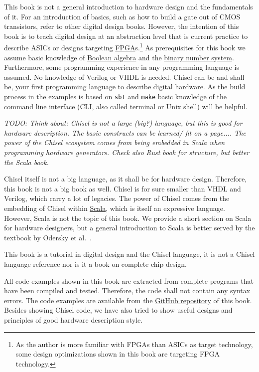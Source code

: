 \documentclass[%
    10pt, %
    headinclude, footexclude,
    openright, %
    notitlepage,
    cleardoubleempty,
    headsepline,
    pointlessnumbers,
    bibtotoc, idxtotoc,
    ]{scrbook}
\newcommand{\code}[1]{{\small{\texttt{#1}}}}
\newcommand{\todo}[1]{{\emph{TODO: #1}}}
\newcommand{\myref}[2]{\href{#1}{#2}}
\begin{document}
This book is not a general introduction to hardware design and the fundamentals of it.
For an introduction of basics, such as how to build a gate out of CMOS transistors,
refer to other digital design books.
However, the intention of this book is to teach digital design at an abstraction level that is
current practice to describe ASICs or designs targeting
\myref{https://en.wikipedia.org/wiki/Field-programmable_gate_array}{FPGA}s.\footnote{As the author is more familiar with FPGAs
than ASICs as target technology, some design optimizations shown in this book are
targeting FPGA technology.}
As prerequisites for this book we assume basic knowledge of
\myref{https://en.wikipedia.org/wiki/Boolean_algebra}{Boolean algebra} and the
\myref{https://en.wikipedia.org/wiki/Binary_number}{binary number system}.
Furthermore, some programming experience in any programming language
is assumed. No knowledge of Verilog or VHDL is needed.
Chisel can be and shall be, your first programming language to describe digital hardware.
As the build process in the examples is based on \code{sbt} and \code{make}
basic knowledge of the command line interface (CLI, also called terminal or
Unix shell) will be helpful.

\todo{Think about: Chisel is not a large (big?) language, but this is good for hardware description. The basic constructs can be learned/ fit on a page.... The power of the Chisel ecosystem comes from being embedded in Scala when programming hardware generators.
Check also Rust book for structure, but better the Scala book.}

Chisel itself is not a big language, as it shall be for hardware design.
Therefore, this book is not a big book as well.
Chisel is for sure smaller than VHDL and Verilog, which carry a lot of legacies.
The power of Chisel comes from the embedding of Chisel within
\myref{https://www.scala-lang.org/}{Scala}, which is itself an expressive language.
However, Scala is not the topic
of this book. We provide a short section on Scala for hardware designers,
but a general introduction to Scala is better served by the textbook by
Odersky et al.~\cite{Scala}.

This book is a tutorial in digital design and the Chisel language, it is not
a Chisel language reference nor is it a book on complete chip design.


All code examples shown in this book are extracted from complete programs
that have been compiled and tested. Therefore, the code shall not contain
any syntax errors. The code examples are available from the
\myref{https://github.com/schoeberl/chisel-book}{GitHub repository}
of this book.
Besides showing Chisel code, we have also tried to show useful designs and
principles of good hardware description style.
\end{document}
